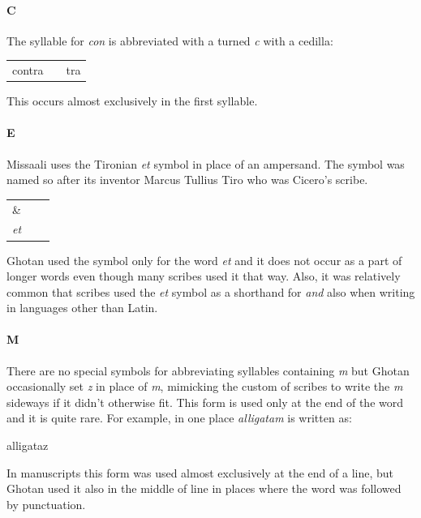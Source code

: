 \documentclass[a4paper, 12pt]{article}
\newcommand{\sample}[1]{{\mstexturafamily\fontsize{18}{18}\selectfont #1}}
\begin{document}
\paragraph{C} The syllable for \emph{con} is abbreviated with a turned
\emph{c} with a cedilla:
\begin{center}
  \begin{tabular}{lcl}
    \sample{contra} & \aqsample{$\Longrightarrow$} & \sample{\msabbr{con}tra}
  \end{tabular}
\end{center}

This occurs almost exclusively in the first syllable.

\paragraph{E} Missaali uses the Tironian \emph{et} symbol in place of
an ampersand. The symbol was named so after its inventor Marcus
Tullius Tiro who was Cicero's scribe.
\begin{center}
  \begin{tabular}{ccc}
    \sample{\&} \\
    \emph{et} 
  \end{tabular}
\end{center}

Ghotan used the symbol only for the word \emph{et} and it does not
occur as a part of longer words even though many scribes used it that
way. Also, it was relatively common that scribes used the \emph{et}
symbol as a shorthand for \emph{and} also when writing in languages
other than Latin.

\paragraph{M} There are no special symbols for abbreviating syllables
containing \emph{m} but Ghotan occasionally set \emph{z} in place of
\emph{m}, mimicking the custom of scribes to write the \emph{m}
sideways if it didn't otherwise fit. This form is used only at the end
of the word and it is quite rare. For example, in one place
\emph{alligatam} is written as:
\begin{center}
  \sample{alligataz}
\end{center}

In manuscripts this form was used almost exclusively at the end of a
line, but Ghotan used it also in the middle of line in places where
the word was followed by punctuation.
\end{document}
